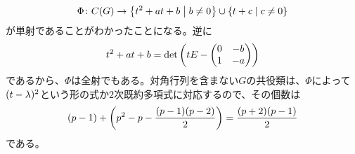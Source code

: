 \begin{sol}
\begin{description}
      \[
      \Phi \colon C(G) \to \left\{ t^2 + at + b \mathrel{} \middle| \mathrel{}  b \neq 0   \right\} \cup \left\{ t + c \mathrel{} \middle| \mathrel{}  c \neq 0   \right\}
      \]
が単射であることがわかったことになる。逆に
\[
t^2 + at + b = \det \left( t E - \begin{pmatrix} 0 & -b \\ 1 & -a \end{pmatrix} \right)
\]
であるから、$\Phi$は全射でもある。対角行列を含まない$G$の共役類は、$\Phi$によって$(t- {\lambda})^2$という形の式か$2$次既約多項式に対応するので、その個数は
\[
(p-1) + \left( p^2 - p - \frac{(p-1)(p-2)}{2}  \right) = \frac{(p+2)(p-1)}{2}
\]
である。
  \end{description}
\end{sol}
